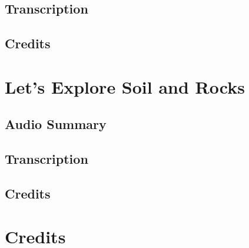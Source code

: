 \subsection{Transcription}

\subsection{Credits}

\section{Let's Explore Soil and Rocks}

\subsection{Audio Summary}

\subsection{Transcription}

\subsection{Credits}

\section{Credits}